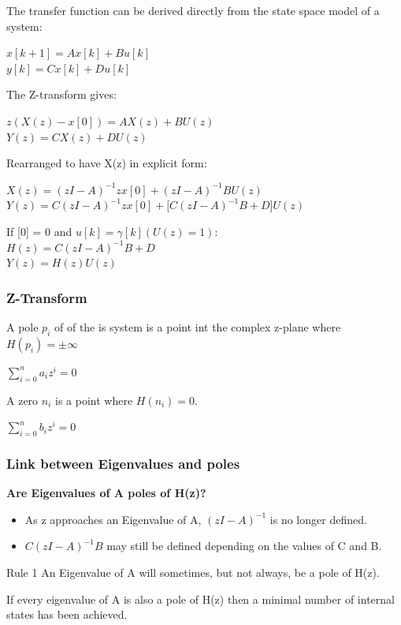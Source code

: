 \begin{frame}
	The transfer function can be derived directly from the state space model of a system:\\
	\begin{center}
		$x[k+1] = Ax[k] + Bu[k] $\\
		$y[k] = Cx[k]+Du[k]$
	\end{center}
	The Z-transform gives:
	\begin{center}
		$z(X(z)-x[0]) = AX(z)+BU(z)$\\
		$Y(z) = CX(z)+DU(z)$
	\end{center}
	Rearranged to have X(z) in explicit form:
	\begin{center}
		$X(z) = (zI-A)^{-1}zx[0] + (zI-A)^{-1}BU(z) $\\
		$Y(z) = C(zI-A)^{-1}zx[0] + \bigg[C(zI-A)^{-1}B + D\bigg]U(z)$
	\end{center}
	If [0] = 0 and $u[k] = \gamma[k] (U(z)=1)$:\\
	$H(z) = C(zI-A)^{-1}B + D$\\
	$Y(z)=H(z)U(z)$
\end{frame}
\begin{frame}
	\frametitle{Z-Transform}
	\begin{definition}
		A pole $p_i$ of of the is system is a point int the complex z-plane where $H(p_i) = \pm \infty$\\
		\begin{center}
			$\sum\limits_{i=0}^{n}a_iz^{i} = 0$
		\end{center}
		
	\end{definition}
	\begin{definition}
		A zero $n_i$ is a point where $H(n_i)=0$.\\
		\begin{center}
			$\sum\limits_{i=0}^{n}b_iz^{i} = 0$
		\end{center}
		
	\end{definition}
\end{frame}
\begin{frame}
	\frametitle{Link between Eigenvalues and poles}
	\textbf{Are Eigenvalues of A poles of H(z)?}\\
	\small{
	\begin{itemize}
			\item As z approaches an Eigenvalue of A, $(zI-A)^{-1}$ is no longer defined.\\
			\item $C(zI-A)^{-1}B$	may still be defined depending on the values of C and B.
	\end{itemize}
}
	\begin{block}{Rule 1}
			An Eigenvalue of A will sometimes, but not always, be a pole of H(z).
	\end{block}
	\begin{definition}
		If every eigenvalue of A is also a pole of H(z) then a minimal number of internal states has been achieved.
	\end{definition}
	
	
\end{frame}
